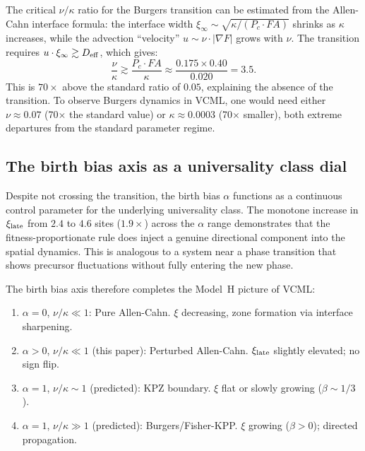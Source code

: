 \documentclass[11pt]{article}
\begin{document}
The critical $\nu/\kappa$ ratio for the Burgers transition can be estimated
from the Allen-Cahn interface formula: the interface width $\xi_\infty \sim
\sqrt{\kappa/(P_c \cdot FA)}$ shrinks as $\kappa$ increases, while the
advection ``velocity'' $u \sim \nu \cdot |\nabla F|$ grows with $\nu$.
The transition requires $u \cdot \xi_\infty \gtrsim D_{\rm eff}$, which
gives:
\begin{equation}
  \frac{\nu}{\kappa} \gtrsim \frac{P_c \cdot FA}{\kappa}
  \approx \frac{0.175 \times 0.40}{0.020} = 3.5.
\end{equation}
This is $70\times$ above the standard ratio of $0.05$, explaining the
absence of the transition.
To observe Burgers dynamics in VCML, one would need either $\nu \approx 0.07$
(70$\times$ the standard value) or $\kappa \approx 0.0003$ (70$\times$ smaller),
both extreme departures from the standard parameter regime.

\subsection{The birth bias axis as a universality class dial}

Despite not crossing the transition, the birth bias $\alpha$ functions as
a continuous control parameter for the underlying universality class.
The monotone increase in $\xi_{\rm late}$ from $2.4$ to $4.6$ sites
($1.9\times$) across the $\alpha$ range demonstrates that the fitness-proportionate
rule does inject a genuine directional component into the spatial dynamics.
This is analogous to a system near a phase transition that shows precursor
fluctuations without fully entering the new phase.

The birth bias axis therefore completes the Model~H picture of VCML:
\begin{enumerate}
  \item $\alpha=0$, $\nu/\kappa \ll 1$: Pure Allen-Cahn.
        $\xi$ decreasing, zone formation via interface sharpening.
  \item $\alpha > 0$, $\nu/\kappa \ll 1$ (this paper): Perturbed Allen-Cahn.
        $\xi_{\rm late}$ slightly elevated; no sign flip.
  \item $\alpha=1$, $\nu/\kappa \sim 1$ (predicted): KPZ boundary.
        $\xi$ flat or slowly growing ($\beta \sim 1/3$).
  \item $\alpha=1$, $\nu/\kappa \gg 1$ (predicted): Burgers/Fisher-KPP.
        $\xi$ growing ($\beta > 0$); directed propagation.
\end{enumerate}
\end{document}
